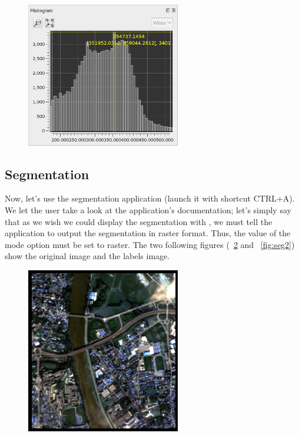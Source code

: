 \begin{figure}[!h] 
  \center
  \includegraphics[width=0.6\textwidth]{../Art/MonteverdiImages/BM2.png}
  \label{fig:BM2}
\end{figure}


\subsection{Segmentation}\label{ssec:monseg}

Now, let's use the segmentation application (launch it with shortcut CTRL+A). 
We let the user take a look at the application's documentation; let's simply say that as we wish we could display the segmentation with \mont,
we must tell the application to output the segmentation in raster format. Thus, the value of the mode option must be set to raster.
The two following figures (~\ref{fig:seg1} and ~\ref{fig:seg2}) show the original image and the labels image.

\begin{figure}[!h] 
  \center
  \includegraphics[width=0.6\textwidth]{../Art/MonteverdiImages/seg1.png}
  \label{fig:seg1}
\end{figure}

